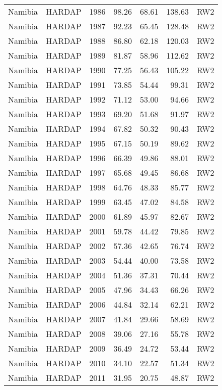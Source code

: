 \begin{longtable}{lllrrrl}
  Namibia & HARDAP & 1986 & 98.26 & 68.61 & 138.63 & RW2 \\ 
  Namibia & HARDAP & 1987 & 92.23 & 65.45 & 128.48 & RW2 \\ 
  Namibia & HARDAP & 1988 & 86.80 & 62.18 & 120.03 & RW2 \\ 
  Namibia & HARDAP & 1989 & 81.87 & 58.96 & 112.62 & RW2 \\ 
  Namibia & HARDAP & 1990 & 77.25 & 56.43 & 105.22 & RW2 \\ 
  Namibia & HARDAP & 1991 & 73.85 & 54.44 & 99.31 & RW2 \\ 
  Namibia & HARDAP & 1992 & 71.12 & 53.00 & 94.66 & RW2 \\ 
  Namibia & HARDAP & 1993 & 69.20 & 51.68 & 91.97 & RW2 \\ 
  Namibia & HARDAP & 1994 & 67.82 & 50.32 & 90.43 & RW2 \\ 
  Namibia & HARDAP & 1995 & 67.15 & 50.19 & 89.62 & RW2 \\ 
  Namibia & HARDAP & 1996 & 66.39 & 49.86 & 88.01 & RW2 \\ 
  Namibia & HARDAP & 1997 & 65.68 & 49.45 & 86.68 & RW2 \\ 
  Namibia & HARDAP & 1998 & 64.76 & 48.33 & 85.77 & RW2 \\ 
  Namibia & HARDAP & 1999 & 63.45 & 47.02 & 84.58 & RW2 \\ 
  Namibia & HARDAP & 2000 & 61.89 & 45.97 & 82.67 & RW2 \\ 
  Namibia & HARDAP & 2001 & 59.78 & 44.42 & 79.85 & RW2 \\ 
  Namibia & HARDAP & 2002 & 57.36 & 42.65 & 76.74 & RW2 \\ 
  Namibia & HARDAP & 2003 & 54.44 & 40.00 & 73.58 & RW2 \\ 
  Namibia & HARDAP & 2004 & 51.36 & 37.31 & 70.44 & RW2 \\ 
  Namibia & HARDAP & 2005 & 47.96 & 34.43 & 66.26 & RW2 \\ 
  Namibia & HARDAP & 2006 & 44.84 & 32.14 & 62.21 & RW2 \\ 
  Namibia & HARDAP & 2007 & 41.84 & 29.66 & 58.69 & RW2 \\ 
  Namibia & HARDAP & 2008 & 39.06 & 27.16 & 55.78 & RW2 \\ 
  Namibia & HARDAP & 2009 & 36.49 & 24.72 & 53.44 & RW2 \\ 
  Namibia & HARDAP & 2010 & 34.10 & 22.57 & 51.34 & RW2 \\ 
  Namibia & HARDAP & 2011 & 31.95 & 20.75 & 48.87 & RW2 \\ 

\end{longtable}
